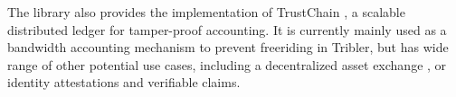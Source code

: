 The library also provides the implementation of TrustChain \cite{trustchain}, a scalable distributed ledger for tamper-proof accounting. It is currently mainly used as a bandwidth accounting mechanism to prevent freeriding in Tribler, but has wide range of other potential use cases, including a decentralized asset exchange \cite{xchange}, or identity attestations and verifiable claims.






